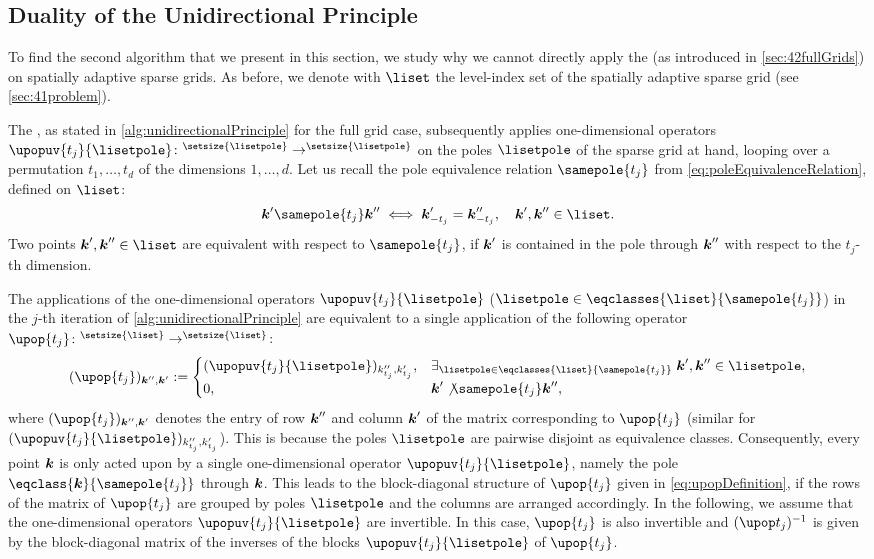 \subsection{Duality of the Unidirectional Principle}
\label{sec:452duality}

To find the second algorithm that we present in this section,
we study why we cannot directly apply the \up
(as introduced in \cref{sec:42fullGrids}) on spatially adaptive sparse grids.
As before, we denote with $\liset$ the level-index set of
the spatially adaptive sparse grid (see \cref{sec:41problem}).

The \up, as stated in
\cref{alg:unidirectionalPrinciple} for the full grid case,
subsequently applies one-dimensional operators
$\upopuv{t_j}{\lisetpole}\colon \real^{\setsize{\lisetpole}} \to
\real^{\setsize{\lisetpole}}$
on the poles $\lisetpole$ of the sparse grid at hand,
looping over a permutation $t_1, \dotsc, t_d$
of the dimensions $1, \dotsc, d$.
Let us recall the pole equivalence relation $\samepole{t_j}$
from \cref{eq:poleEquivalenceRelation}, defined on $\liset$:
\begin{equation}
  \*k' \samepole{t_j} \*k'' \iff \*k'_{-t_j} = \*k''_{-t_j},\quad
  \*k', \*k'' \in \liset.
\end{equation}
Two points $\*k', \*k'' \in \liset$ are equivalent with respect to
$\samepole{t_j}$, if ${\boldsymbol{k}}'$ is contained in the pole through ${\boldsymbol{k}}''$
with respect to the $t_j$-th dimension.

The applications of the one-dimensional operators
$\upopuv{t_j}{\lisetpole}$
($\lisetpole \in \eqclasses{\liset}{\samepole{t_j}}$)
in the $j$-th iteration of \cref{alg:unidirectionalPrinciple}
are equivalent to a single application of the following operator
$\upop{t_j}\colon \real^{\setsize{\liset}} \to \real^{\setsize{\liset}}$:
\begin{equation}
  \label{eq:upopDefinition}
  (\upop{t_j})_{\*k'',\*k'}
  :=
  \begin{cases}
    (\upopuv{t_j}{\lisetpole})_{k''_{t_j},k'_{t_j}},&
    \ex{\lisetpole \in \eqclasses{\liset}{\samepole{t_j}}}{
      \*k', \*k'' \in \lisetpole
    },\\
    0,&\*k' \not\samepole{t_j} \*k'',
  \end{cases}
\end{equation}
where $(\upop{t_j})_{\*k'',\*k'}$ denotes the entry of row ${\boldsymbol{k}}''$
and column ${\boldsymbol{k}}'$ of the matrix corresponding to $\upop{t_j}$
(similar for $(\upopuv{t_j}{\lisetpole})_{k''_{t_j},k'_{t_j}}$).
This is because the poles $\lisetpole$ are pairwise disjoint
as equivalence classes.
Consequently, every point ${\boldsymbol{k}}$ is only acted upon by a single
one-dimensional operator $\upopuv{t_j}{\lisetpole}$,
namely the pole $\eqclass{\*k}{\samepole{t_j}}$ through ${\boldsymbol{k}}$.
This leads to the block-diagonal structure
of $\upop{t_j}$ given in \eqref{eq:upopDefinition},
if the rows of the matrix of $\upop{t_j}$
are grouped by poles $\lisetpole$ and the columns are arranged accordingly.
In the following, we assume that the one-dimensional operators
$\upopuv{t_j}{\lisetpole}$ are invertible.
In this case, $\upop{t_j}$ is also invertible and
$\upopinv{t_j}$ is given by the block-diagonal matrix of
the inverses of the blocks $\upopuv{t_j}{\lisetpole}$ of $\upop{t_j}$.

